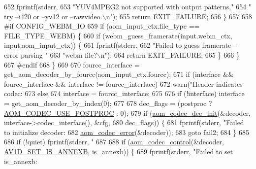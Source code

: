 \begin{DoxyCodeInclude}
{{{{{{{{{{{{{{{{{{{{{{{{{{{{{{652       fprintf(stderr,
653               \textcolor{stringliteral}{"YUV4MPEG2 not supported with output patterns,"}
654               \textcolor{stringliteral}{" try --i420 or --yv12 or --rawvideo.\(\backslash\)n"});
655       \textcolor{keywordflow}{return} EXIT\_FAILURE;
656     \}
657 
658 \textcolor{preprocessor}{#if CONFIG\_WEBM\_IO}
659     \textcolor{keywordflow}{if} (aom\_input\_ctx.file\_type == FILE\_TYPE\_WEBM) \{
660       \textcolor{keywordflow}{if} (webm\_guess\_framerate(input.webm\_ctx, input.aom\_input\_ctx)) \{
661         fprintf(stderr,
662                 \textcolor{stringliteral}{"Failed to guess framerate -- error parsing "}
663                 \textcolor{stringliteral}{"webm file?\(\backslash\)n"});
664         \textcolor{keywordflow}{return} EXIT\_FAILURE;
665       \}
666     \}
667 \textcolor{preprocessor}{#endif}
668   \}
669 
670   fourcc\_interface = get\_aom\_decoder\_by\_fourcc(aom\_input\_ctx.fourcc);
671   \textcolor{keywordflow}{if} (interface && fourcc\_interface && interface != fourcc\_interface)
672     warn(\textcolor{stringliteral}{"Header indicates codec: %
673   \textcolor{keywordflow}{else}
674     \textcolor{keyword}{interface }= fourcc\_interface;
675 
676   \textcolor{keywordflow}{if} (!interface) \textcolor{keyword}{interface }= get\_aom\_decoder\_by\_index(0);
677 
678   dec\_flags = (postproc ? \hyperlink{group__decoder_ga7b6c145833964c9edd3ff78be017f7ec}{AOM\_CODEC\_USE\_POSTPROC} : 0);
679   \textcolor{keywordflow}{if} (\hyperlink{group__decoder_gafdbfca65b19ab1f6d72b32cd01753b9b}{aom\_codec\_dec\_init}(&decoder, interface->codec\_interface(), &cfg,
680                          dec\_flags)) \{
681     fprintf(stderr, \textcolor{stringliteral}{"Failed to initialize decoder: %
682             \hyperlink{group__codec_ga50949c0854605c722832bbfb0803f5f4}{aom\_codec\_error}(&decoder));
683     \textcolor{keywordflow}{goto} fail2;
684   \}
685 
686   \textcolor{keywordflow}{if} (!quiet) fprintf(stderr, \textcolor{stringliteral}{"%
687 
688   \textcolor{keywordflow}{if} (\hyperlink{group__codec_ga6da974f4eeaba1fa74106b28d0fe6ac5}{aom\_codec\_control}(&decoder, \hyperlink{group__aom__decoder_gga3865fd4b3192489baa9a5c3632ebe97ba1fb269c5c5913d9995b6c35d28e2a788}{AV1D\_SET\_IS\_ANNEXB}, is\_annexb)) \{
689     fprintf(stderr, \textcolor{stringliteral}{"Failed to set is\_annexb: %
}}}}}}}}}}}}}}}}}}}}}}}}}}}}}}}}}}
\end{DoxyCodeInclude}
